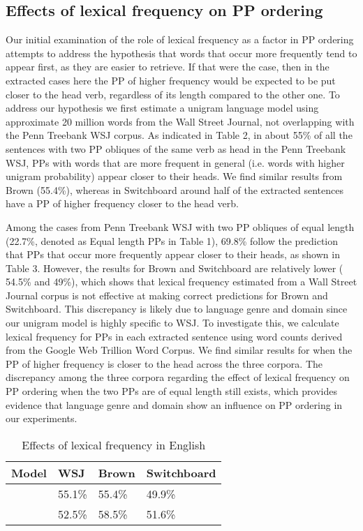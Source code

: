 \documentclass[11pt,letterpaper]{article}
\begin{document}
\subsection{Effects of lexical frequency on PP ordering}

Our initial examination of the role of lexical frequency as a factor in PP ordering attempts to address the hypothesis that words that occur more frequently tend to appear first, as they are easier to retrieve. If that were the case, then in the extracted cases here the PP of higher frequency would be expected to be put closer to the head verb, regardless of its length compared to the other one. To address our hypothesis we first estimate a unigram language model using approximate 20 million words from the Wall Street Journal, not overlapping with the Penn Treebank WSJ corpus. As indicated in Table 2, in about 55\% of all the sentences with two PP obliques of the same verb as head in the Penn Treebank WSJ, PPs with words that are more frequent in general (i.e. words with higher unigram probability) appear closer to their heads. We find similar results from Brown (55.4\%), whereas in Switchboard around half of the extracted sentences have a PP of higher frequency closer to the head verb. 

Among the cases from Penn Treebank WSJ with two PP obliques of equal length (22.7\%, denoted as Equal length PPs in Table 1), 69.8\% follow the prediction that PPs that occur more frequently appear closer to their heads, as shown in Table 3. However, the results for Brown and Switchboard are relatively lower ( 54.5\% and 49\%), which shows that lexical frequency estimated from a Wall Street Journal corpus is not effective at making correct predictions for Brown and Switchboard. This discrepancy is likely due to language genre and domain since our unigram model is highly specific to WSJ. To investigate this, we calculate lexical frequency for PPs in each extracted sentence using word counts derived from the Google Web Trillion Word Corpus. We find similar results for when the PP of higher frequency is closer to the head across the three corpora. The discrepancy among the three corpora regarding the effect of lexical frequency on PP ordering when the two PPs are of equal length still exists, which provides evidence that language genre and domain show an influence on PP ordering in our experiments.

\begin{table}[h!]
\small
\centering
				\begin{tabular}{|p{2cm}|p{1cm}|p{1cm}|p{2cm}|}
		\hline
	Model &	WSJ & Brown & Switchboard \\ \hline
	& 55.1\% & 55.4\% & 49.9\% \\
	& 52.5\% & 58.5\% & 51.6\% \\
	\hline
				\end{tabular}	
		\caption{Effects of lexical frequency in English}
		\end{table}
		
\end{document}
